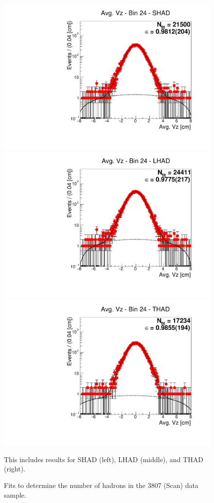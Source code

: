 \begin{figure}[H]
\centering
\includegraphics[scale=0.25]{figures/plots/nonDDbar_fit_results/scan/fit_scan_24_data_SHAD.pdf}
\hspace{-0.5cm}
\includegraphics[scale=0.25]{figures/plots/nonDDbar_fit_results/scan/fit_scan_24_data_LHAD.pdf}
\hspace{-0.5cm}
\includegraphics[scale=0.25]{figures/plots/nonDDbar_fit_results/scan/fit_scan_24_data_THAD.pdf}
\caption{Fits to determine the number of hadrons in the 3807 (Scan) data sample.}
{This includes results for SHAD (left), LHAD (middle), and THAD (right).}
\label{fig:hadron_fits_scan_24}
\end{figure}


